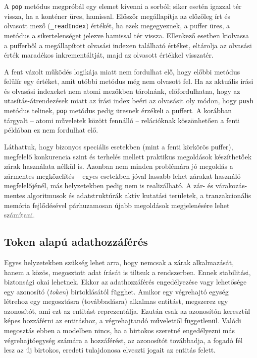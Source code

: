     A \texttt{pop} metódus megpróbál egy elemet kivenni a sorból; siker esetén igazzal tér vissza, ha a konténer üres, hamissal. Először megállapítja az előzőleg írt és olvasott mező (\texttt{\_readIndex}) értékét, ha ezek megegyeznek, a puffer üres, a metódus a sikertelenséget jelezve hamissal tér vissza. Ellenkező esetben kiolvassa a pufferből a megállapított olvasási indexen található értéket, eltárolja az olvasási érték maradékos inkrementáltját, majd az olvasott értékkel visszatér.
    
    A fent vázolt működés logikája miatt nem fordulhat elő, hogy előbbi metódus felülír egy értéket, amit utóbbi metódus még nem olvasott fel. Ha az aktuális írási és olvasási indexeket nem atomi mezőkben tárolnánk, előfordulhatna, hogy az utasítás-átrendezések miatt az írási index beéri az olvasásit oly módon, hogy \texttt{push} metódus telinek, \texttt{pop} metódus pedig üresnek érzékeli a puffert. A korábban tárgyalt -- atomi műveletek között fennálló -- relációknak köszönhetően a fenti példában ez nem fordulhat elő.
    
    Láthattuk, hogy bizonyos speciális esetekben (mint a fenti körkörös puffer), megfelelő konkurencia szint és terhelés mellett praktikus megoldások készíthetőek zárak használata nélkül is. Azonban nem minden problémára jó megoldás a zármentes megközelítés -- egyes esetekben jóval lassabb lehet zárakat használó megfelelőjénél, más helyzetekben pedig nem is realizálható. A zár- és várakozás-mentes algoritmusok és adatstruktúrák aktív kutatási területek, a tranzakcionális memória fejlődésével párhuzamosan újabb megoldások megjelenésére lehet számítani.
    
    \vfill
    
    \subsection{Token alapú adathozzáférés} 
    \label{seq:messagepassing}
    
    Egyes helyzetekben szükség lehet arra, hogy nemcsak a zárak alkalmazását, hanem a közös, megosztott adat írását is tiltsuk a rendszerben. Ennek stabilitási, biztonsági okai lehetnek. Ekkor az adathozzáférés engedélyezése vagy lehetősége egy azonosító (\emph{token}) birtoklásától függhet. Amikor egy végrehajtó egység létrehoz egy megosztásra (továbbadásra) alkalmas entitást, megszerez egy azonosítót, ami ezt az entitást reprezentálja. Ezután csak az azonosítón keresztül képes hozzáférni az entitáshoz, a végrehajtandó művelettől függetlenül. Valódi megosztás ebben a modelben nincs, ha a birtokos szeretné engedélyezni más végrehajtóegység számára a hozzáférést, az azonosítót továbbadja, a fogadó fél lesz az új birtokos, eredeti tulajdonosa elveszti jogait az entitás felett.
    
